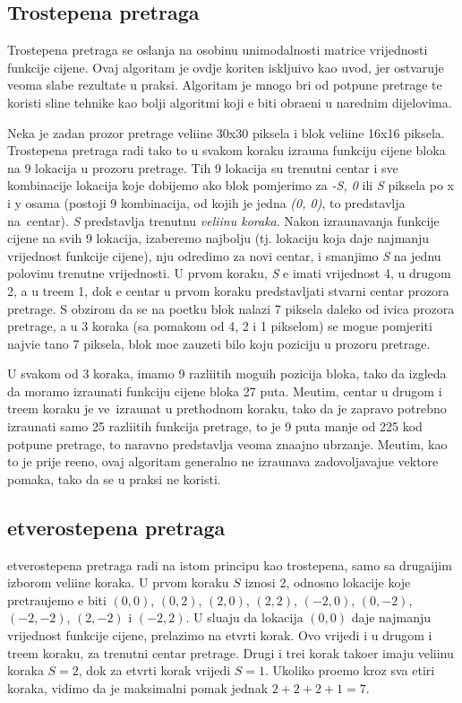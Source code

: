 \subsection{Trostepena pretraga}
Trostepena pretraga se oslanja na osobinu unimodalnosti matrice vrijednosti funkcije cijene. Ovaj algoritam je ovdje kori\sh ten isklju\ch ivo kao uvod, jer ostvaruje veoma slabe rezultate u praksi. Algoritam je mnogo br\zh i
od potpune pretrage te koristi sli\ch ne tehnike kao bolji algoritmi koji \cj e biti obra\dj eni u narednim dijelovima.

Neka je zadan prozor pretrage veli\ch ine 30x30 piksela i blok veli\ch ine 16x16 piksela. Trostepena pretraga radi tako \sh to u svakom koraku izra\ch una funkciju cijene bloka na 9 lokacija u prozoru pretrage. Tih 9 lokacija su
trenutni centar i sve kombinacije lokacija koje dobijemo ako blok pomjerimo za \textit{-S, 0} ili \textit{S} piksela po x i y osama (postoji 9 kombinacija, od kojih je jedna \textit{(0, 0)}, \sh to predstavlja na\sh\ centar).
\textit{S} predstavlja trenutnu \textit{veli\ch inu koraka}. Nakon izra\ch unavanja funkcije cijene na svih 9 lokacija, izaberemo najbolju (tj. lokaciju koja daje najmanju vrijednost funkcije cijene), nju odredimo za novi centar, i 
smanjimo \textit{S} na jednu polovinu trenutne vrijednosti. U prvom koraku, \textit{S} \cj e imati vrijednost 4, u drugom 2, a u tre\cj em 1, dok \cj e centar u prvom koraku predstavljati stvarni centar prozora pretrage. 
S obzirom da se na po\ch etku blok nalazi 7 piksela daleko od ivica prozora pretrage, a u 3 koraka (sa pomakom od 4, 2 i 1 pikselom) se mogu\cj e pomjeriti najvi\sh e ta\ch no 7 piksela, blok mo\zh e zauzeti bilo koju 
poziciju u prozoru pretrage.

U svakom od 3 koraka, imamo 9 razli\ch itih mogu\cj ih pozicija bloka, tako da izgleda da moramo izra\ch unati funkciju cijene bloka 27 puta. Me\dj utim, centar u drugom i tre\cj em koraku je ve\cj\ izra\ch unat u prethodnom
koraku, tako da je zapravo potrebno izra\ch unati samo 25 razli\ch itih funkcija pretrage, \sh to je 9 puta manje od 225 kod potpune pretrage, \sh to naravno predstavlja veoma zna\ch ajno ubrzanje. Me\dj utim, kao \sh to je
prije re\ch eno, ovaj algoritam generalno ne izra\ch unava zadovoljavaju\cj e vektore pomaka, tako da se u praksi ne koristi.

\subsection{\CH etverostepena pretraga}
\CH etverostepena pretraga radi na istom principu kao trostepena, samo sa druga\ch ijim izborom veli\ch ine koraka. U prvom koraku $S$ iznosi 2, odnosno lokacije koje pretra\zh ujemo \cj e biti $(0, 0)$, $(0, 2)$, $(2, 0)$, $(2, 2)$,
$(-2, 0)$, $(0, -2)$, $(-2, -2)$, $(2, -2)$ i $(-2, 2)$. U slu\ch aju da lokacija $(0, 0)$ daje najmanju vrijednost funkcije cijene, prelazimo na \ch etvrti korak. Ovo vrijedi i u drugom i tre\cj em koraku, za trenutni centar pretrage. Drugi i
tre\cj i korak tako\dj er imaju veli\ch inu koraka $S=2$, dok za \ch etvrti korak vrijedi $S=1$. Ukoliko pro\dj emo kroz sva \ch etiri koraka, vidimo da je maksimalni pomak jednak $2+2+2+1=7$.

